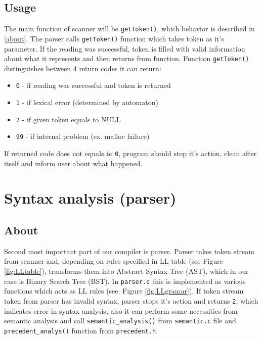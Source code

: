 \documentclass[11pt, titlepage]{article}
\begin{document}
\subsection{Usage}\label{usage}

The main function of scanner will be \texttt{getToken()}, which behavior
is described in \ref{about}. The parser calls \texttt{getToken()} function which takes
token as it's parameter. If the reading was
successful, token is filled with valid
information about what it represents and then returns from function.
Function \texttt{getToken()} distinguishes between 4 return codes it can
return: 
\begin{itemize}[itemsep=-5pt]
\item
	\texttt{0} - if reading was successful and token is returned
\item
	\texttt{1} - if lexical error (determined by automaton)
\item
	\texttt{2} - if given token equals to NULL
\item
	\texttt{99} - if internal problem (ex. malloc failure)
\end{itemize}

If returned code does not equals to \texttt{0}, program should stop it's
action, clean after itself and inform user about what happened.






\section{Syntax analysis (parser)}\label{syntax-analysis-parser}

\subsection{About}\label{about-1}

Second most important part of our compiler is parser. Parser takes
token stream from scanner and,
depending on rules specified in LL table (see Figure \ref{fig:LLtable}), transforms
them into Abstract Syntax Tree (AST), which in our case is Binary
Search Tree (BST). In \texttt{parser.c} this is implemented as various
functions which acts as LL rules (see. Figure \ref{fig:LLgramar}). If token stream
taken from parser has invalid syntax, parser stops it's action and
returns \texttt{2}, which indicates error in syntax analysis, also
it can perform some necessities from semantic analysis and call \texttt{semantic\_analysis()} from \texttt{semantic.c} file and 
\texttt{precedent\_analys()} function from \texttt{precedent.h}.
\end{document}
